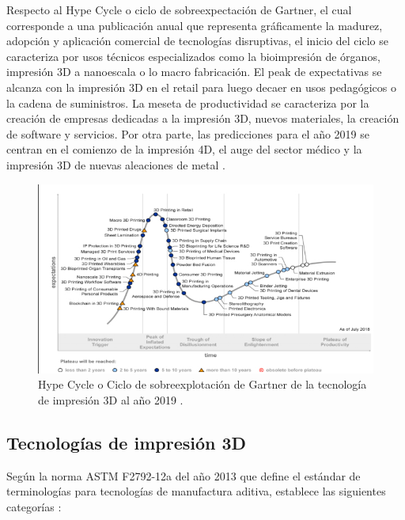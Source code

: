 Respecto al Hype Cycle o ciclo de sobreexpectación de Gartner, el cual corresponde a una publicación anual que representa gráficamente la madurez, adopción y aplicación comercial de tecnologías disruptivas, el inicio del ciclo se caracteriza por usos técnicos especializados como la bioimpresión de órganos, impresión 3D a nanoescala o lo macro fabricación. El peak de expectativas se alcanza con la impresión 3D en el retail para luego decaer en usos pedagógicos o la cadena de suministros. La meseta de productividad se caracteriza por la creación de empresas dedicadas a la impresión 3D, nuevos materiales, la creación de software y servicios. Por otra parte, las predicciones para el año 2019 se centran en el comienzo de la impresión 4D, el auge del sector médico y la impresión 3D de nuevas aleaciones de metal \citep{valdivieso2019}.

\begin{figure}[H]
\centering
\includegraphics[scale=0.8]{images/The3Dprintinghypecycle.png}
\caption{Hype Cycle o Ciclo de sobreexplotación de Gartner de la tecnología de impresión 3D al año 2019 \citep{valdivieso2019}.}
\end{figure}
  

\subsection{Tecnologías de impresión 3D}

Según la norma ASTM F2792-12a del año 2013 que define el estándar de terminologías para tecnologías de manufactura aditiva, establece las siguientes categorías \citep{astm2013}:

